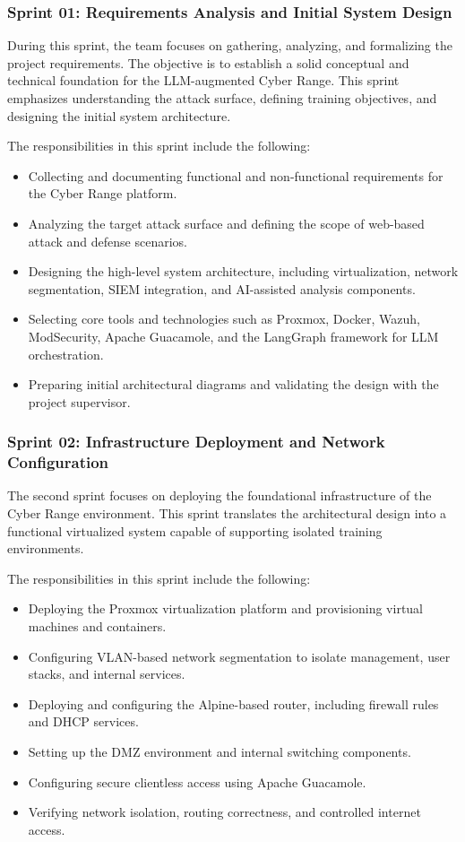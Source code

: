 \subsubsection{Sprint 01: Requirements Analysis and Initial System Design}
During this sprint, the team focuses on gathering, analyzing, and formalizing the project requirements. The objective is to establish a solid conceptual and technical foundation for the LLM-augmented Cyber Range. This sprint emphasizes understanding the attack surface, defining training objectives, and designing the initial system architecture.

The responsibilities in this sprint include the following:
\begin{itemize}
	\item Collecting and documenting functional and non-functional requirements for the Cyber Range platform.
	\item Analyzing the target attack surface and defining the scope of web-based attack and defense scenarios.
	\item Designing the high-level system architecture, including virtualization, network segmentation, SIEM integration, and AI-assisted analysis components.
	\item Selecting core tools and technologies such as Proxmox, Docker, Wazuh, ModSecurity, Apache Guacamole, and the LangGraph framework for LLM orchestration.
	\item Preparing initial architectural diagrams and validating the design with the project supervisor.
\end{itemize}

\subsubsection{Sprint 02: Infrastructure Deployment and Network Configuration}
The second sprint focuses on deploying the foundational infrastructure of the Cyber Range environment. This sprint translates the architectural design into a functional virtualized system capable of supporting isolated training environments.

The responsibilities in this sprint include the following:
\begin{itemize}
	\item Deploying the Proxmox virtualization platform and provisioning virtual machines and containers.
	\item Configuring VLAN-based network segmentation to isolate management, user stacks, and internal services.
	\item Deploying and configuring the Alpine-based router, including firewall rules and DHCP services.
	\item Setting up the DMZ environment and internal switching components.
	\item Configuring secure clientless access using Apache Guacamole.
	\item Verifying network isolation, routing correctness, and controlled internet access.
\end{itemize}

